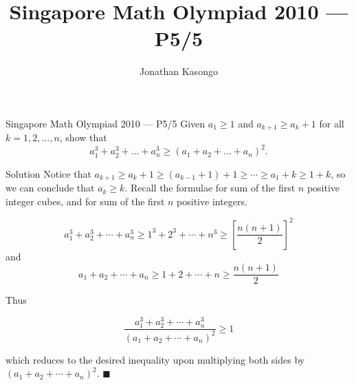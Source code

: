 \documentclass{article}
\author{Jonathan Kasongo}
\title{Singapore Math Olympiad 2010 --- P5/5}
\begin{document}
\maketitle

\begin{problem}{Singapore Math Olympiad 2010 --- P5/5}
Given $a_1\ge 1$ and $a_{k+1}\ge a_k+1$ for all $k = 1,2,\dots,n$, show that $$a_1^3+a_2^3+\dots+a_n^3\ge (a_1+a_2+\dots+a_n)^2.$$
\end{problem}

\begin{solution}{Solution}
Notice that $a_{k+1} \geq a_k + 1 \geq (a_{k-1} + 1) + 1 \geq \cdots \geq
a_1 + k \geq 1 + k$, so we can conclude that $a_k \geq k$. Recall the
formulae for sum of the first $n$ positive integer cubes, and for sum of
the first $n$ positive integers.

$$
a_1^3 + a_2^3 + \cdots + a_n^3 \geq 1^3 + 2^3 + \cdots + n^3 \geq
\left[ \frac{n(n + 1)}{2} \right]^2
$$
and
$$
a_1 + a_2 + \cdots + a_n \geq 1 + 2 + \cdots + n \geq \frac{n(n + 1)}{2}
$$

Thus

$$
\frac{a_1^3 + a_2^3 + \cdots + a_n^3}{(a_1 + a_2 + \cdots + a_n)^2}
\geq 1
$$

which reduces to the desired inequality upon multiplying both sides by
$(a_1 + a_2 + \cdots + a_n)^2$. $\blacksquare$
\end{solution}
\end{document}
